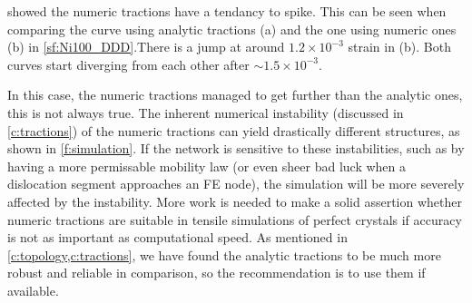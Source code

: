  showed the numeric tractions have a tendancy to spike. This can be seen when comparing the curve using analytic tractions (a) and the one using numeric ones (b) in \cref{sf:Ni100_DDD}.There is a jump at around $1.2\times 10^{-3}$ strain in (b). Both curves start diverging from each other after $\sim 1.5\times 10^{-3}$.

In this case, the numeric tractions managed to get further than the analytic ones, this is not always true. The inherent numerical instability (discussed in \cref{c:tractions}) of the numeric tractions can yield drastically different structures, as shown in \cref{f:simulation}. If the network is sensitive to these instabilities, such as by having a more permissable mobility law (or even sheer bad luck when a dislocation segment approaches an FE node), the simulation will be more severely affected by the instability. More work is needed to make a solid assertion whether numeric tractions are suitable in tensile simulations of perfect crystals if accuracy is not as important as computational speed. As mentioned in \cref{c:topology,c:tractions}, we have found the analytic tractions to be much more robust and reliable in comparison, so the recommendation is to use them if available.

